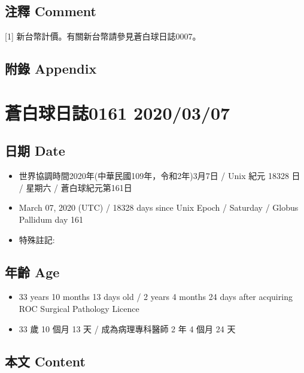\documentclass[a5paper, 12pt
]{book}
\providecommand{\tightlist}{%
  \setlength{\itemsep}{0pt}\setlength{\parskip}{0pt}}
\begin{document}
\hypertarget{ux6ce8ux91cb-comment-5}{%
\subsection{注釋 Comment}\label{ux6ce8ux91cb-comment-5}}

{[}1{]} 新台幣計價。有關新台幣請參見蒼白球日誌0007。

\hypertarget{ux9644ux9304-appendix-5}{%
\subsection{附錄 Appendix}\label{ux9644ux9304-appendix-5}}

\hypertarget{ux84bcux767dux7403ux65e5ux8a8c0161-20200307}{%
\section{蒼白球日誌0161
2020/03/07}\label{ux84bcux767dux7403ux65e5ux8a8c0161-20200307}}

\hypertarget{ux65e5ux671f-date-6}{%
\subsection{日期 Date}\label{ux65e5ux671f-date-6}}

\begin{itemize}
\tightlist
\item
  世界協調時間2020年(中華民國109年，令和2年)3月7日 / Unix 紀元 18328 日
  / 星期六 / 蒼白球紀元第161日
\item
  March 07, 2020 (UTC) / 18328 days since Unix Epoch / Saturday / Globus
  Pallidum day 161
\item
  特殊註記:
\end{itemize}

\hypertarget{ux5e74ux9f61-age-6}{%
\subsection{年齡 Age}\label{ux5e74ux9f61-age-6}}

\begin{itemize}
\tightlist
\item
  33 years 10 months 13 days old / 2 years 4 months 24 days after
  acquiring ROC Surgical Pathology Licence
\item
  33 歲 10 個月 13 天 / 成為病理專科醫師 2 年 4 個月 24 天
\end{itemize}

\hypertarget{ux672cux6587-content-6}{%
\subsection{本文 Content}\label{ux672cux6587-content-6}}
\end{document}
